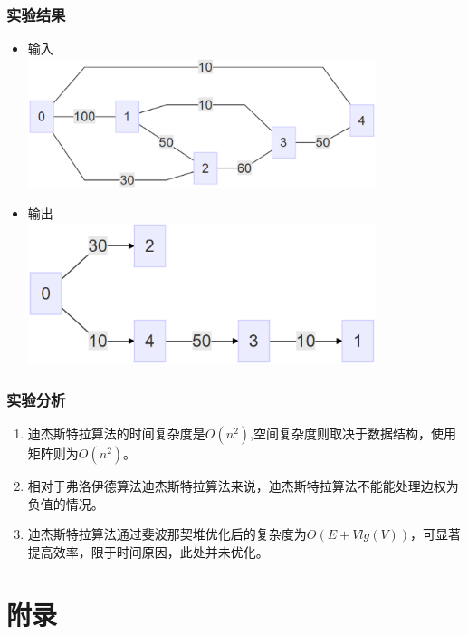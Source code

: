 \documentclass[a4paper,10pt]{ctexart}
\begin{document}
\section{实验结果}
\begin{itemize}
  \item 输入\\
  \includegraphics[width = 4in]{Test.eps}
  \item 输出\\
  \includegraphics[width = 4in]{Test-MinLen.eps}
\end{itemize}

\section{实验分析}
\begin{enumerate}
  \item  迪杰斯特拉算法的时间复杂度是$O(n^2)$,空间复杂度则取决于数据结构，使用矩阵则为$O(n^2)$。
  \item 相对于弗洛伊德算法迪杰斯特拉算法来说，迪杰斯特拉算法不能能处理边权为负值的情况。
  \item 迪杰斯特拉算法通过斐波那契堆优化后的复杂度为$O(E+Vlg(V))$，可显著提高效率，限于时间原因，此处并未优化。
\end{enumerate}

\newpage
\appendix
\part{附录}
\end{document}
